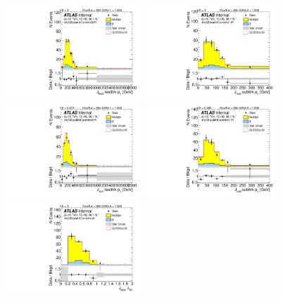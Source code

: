 \begin{figure}[htbp!]
\begin{center}
\includegraphics[angle=270, width=0.45\textwidth]{./figures/boosted/Sideband/b77_FourTag_Sideband_leadHCand_trk0_Pt.pdf}
\includegraphics[angle=270, width=0.45\textwidth]{./figures/boosted/Sideband/b77_FourTag_Sideband_leadHCand_trk1_Pt.pdf}\\
\includegraphics[angle=270, width=0.45\textwidth]{./figures/boosted/Sideband/b77_FourTag_Sideband_sublHCand_trk0_Pt.pdf}
\includegraphics[angle=270, width=0.45\textwidth]{./figures/boosted/Sideband/b77_FourTag_Sideband_sublHCand_trk1_Pt.pdf}\\
\includegraphics[angle=270, width=0.45\textwidth]{./figures/boosted/Sideband/b77_FourTag_Sideband_leadHCand_trk_dr.pdf}

\end{center}
\end{figure}
